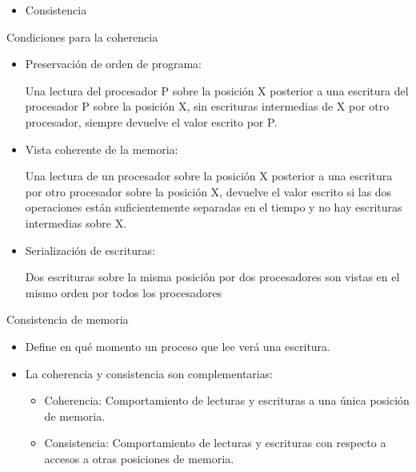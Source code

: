 \documentclass[12pt, twoside, openright]{report} %
\begin{document}
\begin{itemize}
\begin{itemize}
\begin{itemize}
			            \item Consistencia
		            \end{itemize}


	      \end{itemize}

	      Condiciones para la coherencia

	      \begin{itemize}

		      \item Preservación de orden de programa:

		            Una lectura del procesador P sobre la posición X posterior a
		            una escritura del procesador P sobre la posición X, sin
		            escrituras intermedias de X por otro procesador, siempre
		            devuelve el valor escrito por P.

		      \item Vista coherente de la memoria:




		            Una lectura de un procesador sobre la posición X posterior a
		            una escritura por otro procesador sobre la posición X,
		            devuelve el valor escrito si las dos operaciones están
		            suficientemente separadas en el tiempo y no hay escrituras
		            intermedias sobre X.

		      \item Serialización de escrituras:




		            Dos escrituras sobre la misma posición por dos procesadores
		            son vistas en el mismo orden por todos los procesadores

	      \end{itemize}

	      Consistencia de memoria

	      \begin{itemize}

		      \item Define en qué momento un proceso que lee verá una escritura.
		      \item La coherencia y consistencia son complementarias:
		            \begin{itemize}
			            \item Coherencia: Comportamiento de lecturas y escrituras a una
			                  única posición de memoria.

			            \item Consistencia: Comportamiento de lecturas y escrituras con
			                  respecto a accesos a otras posiciones de memoria.
		            \end{itemize}




	      \end{itemize}
\end{itemize}
\end{document}
